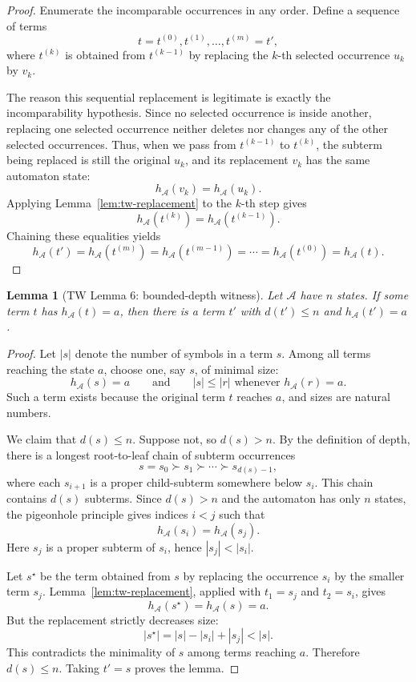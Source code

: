 \documentclass[11pt]{article}
\newtheorem{lemma}[theorem]{Lemma}
\theoremstyle{definition}
\newcommand{\Aut}{\mathcal A}
\begin{document}
\begin{proof}
Enumerate the incomparable occurrences in any order.  Define a sequence of terms
\[
  t=t^{(0)},t^{(1)},\ldots,t^{(m)}=t',
\]
where \(t^{(k)}\) is obtained from \(t^{(k-1)}\) by replacing the \(k\)-th
selected occurrence \(u_k\) by \(v_k\).

The reason this sequential replacement is legitimate is exactly the
incomparability hypothesis.  Since no selected occurrence is inside another,
replacing one selected occurrence neither deletes nor changes any of the other
selected occurrences.  Thus, when we pass from \(t^{(k-1)}\) to \(t^{(k)}\), the
subterm being replaced is still the original \(u_k\), and its replacement \(v_k\)
has the same automaton state:
\[
  h_\Aut(v_k)=h_\Aut(u_k).
\]
Applying Lemma~\ref{lem:tw-replacement} to the \(k\)-th step gives
\[
  h_\Aut(t^{(k)})=h_\Aut(t^{(k-1)}).
\]
Chaining these equalities yields
\[
  h_\Aut(t')
  =
  h_\Aut(t^{(m)})
  =
  h_\Aut(t^{(m-1)})
  =
  \cdots
  =
  h_\Aut(t^{(0)})
  =
  h_\Aut(t).
\]
\end{proof}

\begin{lemma}[TW Lemma 6: bounded-depth witness]\label{lem:tw-bounded-depth}
Let \(\Aut\) have \(n\) states.  If some term \(t\) has \(h_\Aut(t)=a\), then
there is a term \(t'\) with \(d(t')\le n\) and \(h_\Aut(t')=a\).
\end{lemma}

\begin{proof}
Let \(|s|\) denote the number of symbols in a term \(s\).  Among all terms
reaching the state \(a\), choose one, say \(s\), of minimal size:
\[
  h_\Aut(s)=a
  \qquad\text{and}\qquad
  |s|\le |r| \text{ whenever } h_\Aut(r)=a.
\]
Such a term exists because the original term \(t\) reaches \(a\), and sizes are
natural numbers.

We claim that \(d(s)\le n\).  Suppose not, so \(d(s)>n\).  By the definition of
depth, there is a longest root-to-leaf chain of subterm occurrences
\[
  s=s_0 \succ s_1 \succ \cdots \succ s_{d(s)-1},
\]
where each \(s_{i+1}\) is a proper child-subterm somewhere below \(s_i\).  This
chain contains \(d(s)\) subterms.  Since \(d(s)>n\) and the automaton has only
\(n\) states, the pigeonhole principle gives indices \(i<j\) such that
\[
  h_\Aut(s_i)=h_\Aut(s_j).
\]
Here \(s_j\) is a proper subterm of \(s_i\), hence \(|s_j|<|s_i|\).

Let \(s^\star\) be the term obtained from \(s\) by replacing the occurrence
\(s_i\) by the smaller term \(s_j\).  Lemma~\ref{lem:tw-replacement}, applied
with \(t_1=s_j\) and \(t_2=s_i\), gives
\[
  h_\Aut(s^\star)=h_\Aut(s)=a.
\]
But the replacement strictly decreases size:
\[
  |s^\star|=|s|-|s_i|+|s_j|<|s|.
\]
This contradicts the minimality of \(s\) among terms reaching \(a\).  Therefore
\(d(s)\le n\).  Taking \(t'=s\) proves the lemma.
\end{proof}
\end{document}
